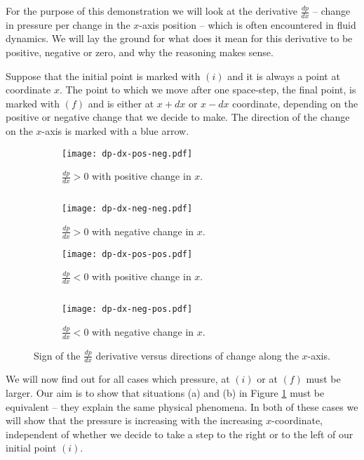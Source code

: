 For the purpose of this demonstration we will look at the derivative $\frac{dp}{dx}$ -- change in pressure per change in the $x$-axis position -- which is often encountered in fluid dynamics. We will lay the ground for what does it mean for this derivative to be positive, negative or zero, and why the reasoning makes sense.

Suppose that the initial point is marked with \textcolor{myblue}{$(i)$} and it is always a point at coordinate $x$. The point to which we move after one space-step, the final point, is marked with \textcolor{myblue}{$(f)$} and is either at $x+dx$ or $x - dx$ coordinate, depending on the positive or negative change that we decide to make. The direction of the change on the $x$-axis is marked with a blue arrow.

\begin{figure}[H]
\begin{subfigure}[t]{.46\textwidth}
\centering
\texttt{[image: dp-dx-pos-neg.pdf]}
\caption{$\frac{dp}{dx} > 0$ with positive change in $x$.}
\end{subfigure}
\begin{minipage}[t]{.07\textwidth}
$ $
\vspace*{1.5cm}
\end{minipage}
\begin{subfigure}[t]{.46\textwidth}
\centering
\texttt{[image: dp-dx-neg-neg.pdf]}
\caption{$\frac{dp}{dx} > 0$ with negative change in $x$.}
\end{subfigure}
\begin{subfigure}[t]{.46\textwidth}
\centering
\texttt{[image: dp-dx-pos-pos.pdf]}
\caption{$\frac{dp}{dx} < 0$ with positive change in $x$.}
\end{subfigure}
\begin{minipage}[t]{.08\textwidth}
$ $
\end{minipage}
\begin{subfigure}[t]{.46\textwidth}
\centering
\texttt{[image: dp-dx-neg-pos.pdf]}
\caption{$\frac{dp}{dx} < 0$ with negative change in $x$.}
\end{subfigure}
\caption{Sign of the $\frac{dp}{dx}$ derivative versus directions of change along the $x$-axis.}
\label{fig:dp-dx-signs}
\end{figure}

We will now find out for all cases which pressure, at \textcolor{myblue}{$(i)$} or at \textcolor{myblue}{$(f)$} must be larger. Our aim is to show that situations (a) and (b) in Figure \ref{fig:dp-dx-signs} must be equivalent -- they explain the same physical phenomena. In both of these cases we will show that the pressure is increasing with the increasing $x$-coordinate, independent of whether we decide to take a step to the right or to the left of our initial point \textcolor{myblue}{$(i)$}. 

